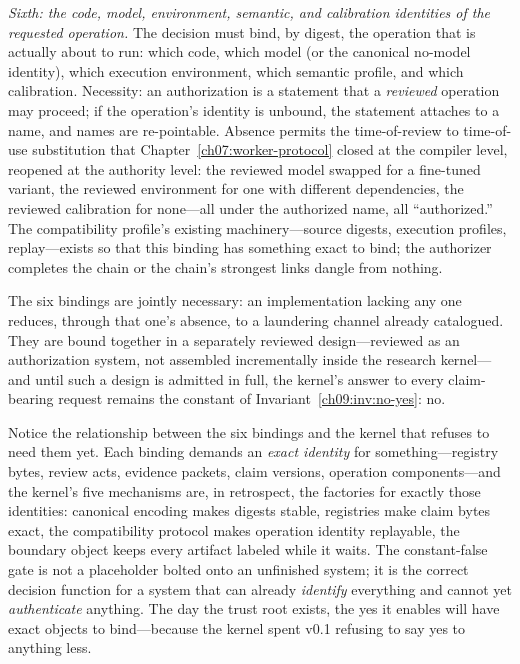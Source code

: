\emph{Sixth: the code, model, environment, semantic, and calibration identities of the requested operation.} The decision must bind, by digest, the operation that is actually about to run: which code, which model (or the canonical no-model identity), which execution environment, which semantic profile, and which calibration. Necessity: an authorization is a statement that a \emph{reviewed} operation may proceed; if the operation's identity is unbound, the statement attaches to a name, and names are re-pointable. Absence permits the time-of-review to time-of-use substitution that Chapter~\ref{ch07:worker-protocol} closed at the compiler level, reopened at the authority level: the reviewed model swapped for a fine-tuned variant, the reviewed environment for one with different dependencies, the reviewed calibration for none---all under the authorized name, all ``authorized.'' The compatibility profile's existing machinery---source digests, execution profiles, replay---exists so that this binding has something exact to bind; the authorizer completes the chain or the chain's strongest links dangle from nothing.

\begin{ruleenv}\label{ch09:rule:conjunction}
The six bindings are jointly necessary: an implementation lacking any one reduces, through that one's absence, to a laundering channel already catalogued. They are bound together in a separately reviewed design---reviewed as an authorization system, not assembled incrementally inside the research kernel---and until such a design is admitted in full, the kernel's answer to every claim-bearing request remains the constant of Invariant~\ref{ch09:inv:no-yes}: no.
\end{ruleenv}

Notice the relationship between the six bindings and the kernel that refuses to need them yet. Each binding demands an \emph{exact identity} for something---registry bytes, review acts, evidence packets, claim versions, operation components---and the kernel's five mechanisms are, in retrospect, the factories for exactly those identities: canonical encoding makes digests stable, registries make claim bytes exact, the compatibility protocol makes operation identity replayable, the boundary object keeps every artifact labeled while it waits. The constant-false gate is not a placeholder bolted onto an unfinished system; it is the correct decision function for a system that can already \emph{identify} everything and cannot yet \emph{authenticate} anything. The day the trust root exists, the yes it enables will have exact objects to bind---because the kernel spent v0.1 refusing to say yes to anything less.

